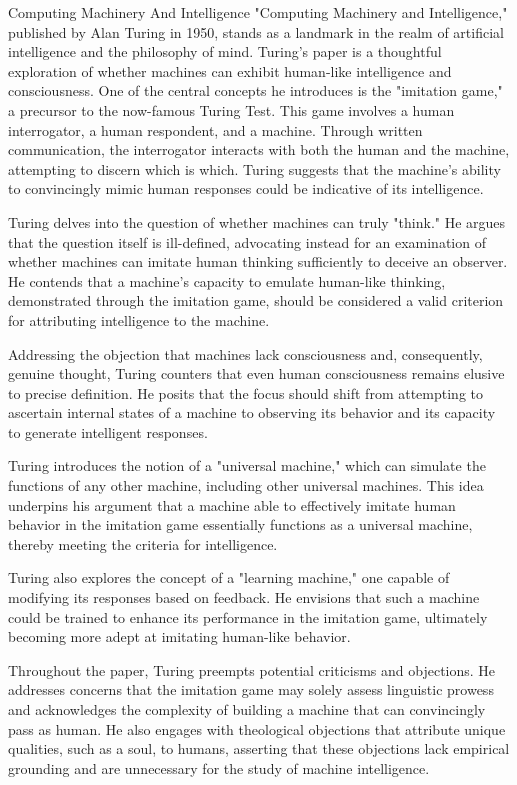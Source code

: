 \begin{notes}{Computing Machinery And Intelligence}
    "Computing Machinery and Intelligence," published by Alan Turing in 1950, stands as a landmark in the realm of artificial intelligence and the philosophy of mind. Turing's paper is a thoughtful 
    exploration of whether machines can exhibit human-like intelligence and consciousness. One of the central concepts he introduces is the "imitation game," a precursor to the now-famous Turing Test. 
    This game involves a human interrogator, a human respondent, and a machine. Through written communication, the interrogator interacts with both the human and the machine, attempting to discern 
    which is which. Turing suggests that the machine's ability to convincingly mimic human responses could be indicative of its intelligence.

    Turing delves into the question of whether machines can truly "think." He argues that the question itself is ill-defined, advocating instead for an examination of whether machines can imitate 
    human thinking sufficiently to deceive an observer. He contends that a machine's capacity to emulate human-like thinking, demonstrated through the imitation game, should be considered a valid 
    criterion for attributing intelligence to the machine.

    Addressing the objection that machines lack consciousness and, consequently, genuine thought, Turing counters that even human consciousness remains elusive to precise definition. He posits that 
    the focus should shift from attempting to ascertain internal states of a machine to observing its behavior and its capacity to generate intelligent responses.

    Turing introduces the notion of a "universal machine," which can simulate the functions of any other machine, including other universal machines. This idea underpins his argument that a machine 
    able to effectively imitate human behavior in the imitation game essentially functions as a universal machine, thereby meeting the criteria for intelligence.

    Turing also explores the concept of a "learning machine," one capable of modifying its responses based on feedback. He envisions that such a machine could be trained to enhance its performance 
    in the imitation game, ultimately becoming more adept at imitating human-like behavior.

    Throughout the paper, Turing preempts potential criticisms and objections. He addresses concerns that the imitation game may solely assess linguistic prowess and acknowledges the complexity of 
    building a machine that can convincingly pass as human. He also engages with theological objections that attribute unique qualities, such as a soul, to humans, asserting that these objections 
    lack empirical grounding and are unnecessary for the study of machine intelligence.


\end{notes}
